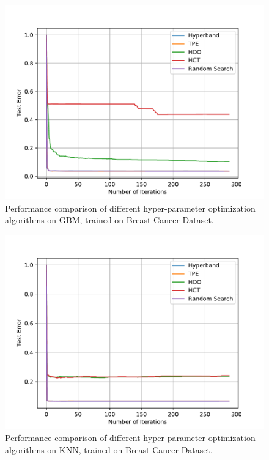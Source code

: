 \documentclass[runningheads,a4paper]{llncs}
\begin{document}
\begin{figure}[ht]
    \centering
    \includegraphics[scale=0.8]{img/uci/gbm_1.pdf}
    \caption{Performance comparison of different hyper-parameter optimization algorithms on GBM, trained on Breast Cancer Dataset.}
    \label{gbm_1}
\end{figure}

\begin{figure}[ht]
    \centering
    \includegraphics[scale=0.8]{img/uci/knn_1.pdf}
    \caption{Performance comparison of different hyper-parameter optimization algorithms on KNN, trained on Breast Cancer Dataset.}
    \label{knn_1}
\end{figure}
\end{document}
